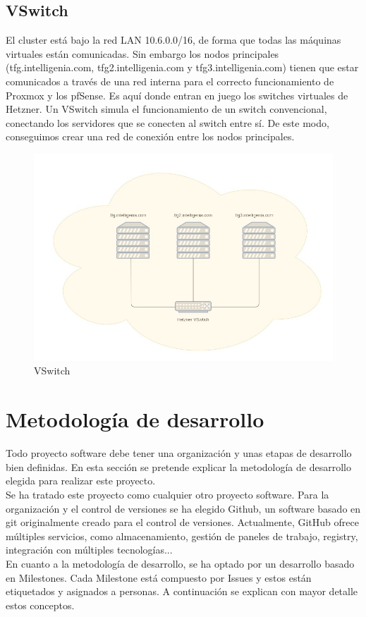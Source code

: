 	\subsection{VSwitch}
	\begin{paragraph}
		El cluster está bajo la red LAN 10.6.0.0/16, de forma que todas las máquinas virtuales están comunicadas. Sin embargo los nodos principales (tfg.intelligenia.com, tfg2.intelligenia.com y tfg3.intelligenia.com) tienen que estar comunicados a través de una red interna para el correcto funcionamiento de Proxmox y los pfSense.
		Es aquí donde entran en juego los switches virtuales de Hetzner. Un VSwitch simula el funcionamiento de un switch convencional, conectando los servidores que se conecten al switch entre sí. De este modo, conseguimos crear una red de conexión entre los nodos principales.
		
		 \begin{figure}[!hbt]
		 	\centering
		 	\includegraphics[scale=0.4]{imagenes/Analisis/vswitch.jpg}
		 	\caption[VSwitch]{VSwitch}
		 	\label{VSwitch}
		 \end{figure}
	\end{paragraph}
	
\section{Metodología de desarrollo}
	\begin{paragraph}
		Todo proyecto software debe tener una organización y unas etapas de desarrollo bien definidas. En esta sección se pretende explicar la metodología de desarrollo elegida para realizar este proyecto. \\
		Se ha tratado este proyecto como cualquier otro proyecto software. Para la organización y el control de versiones se ha elegido Github, un software basado en git originalmente creado para el control de versiones. Actualmente, GitHub ofrece múltiples servicios, como almacenamiento, gestión de paneles de trabajo, registry, integración con múltiples tecnologías... \\
		En cuanto a la metodología de desarrollo, se ha optado por un desarrollo basado en Milestones. Cada Milestone está compuesto por Issues y estos están etiquetados y asignados a personas. A continuación se explican con mayor detalle estos conceptos.
	\end{paragraph}

